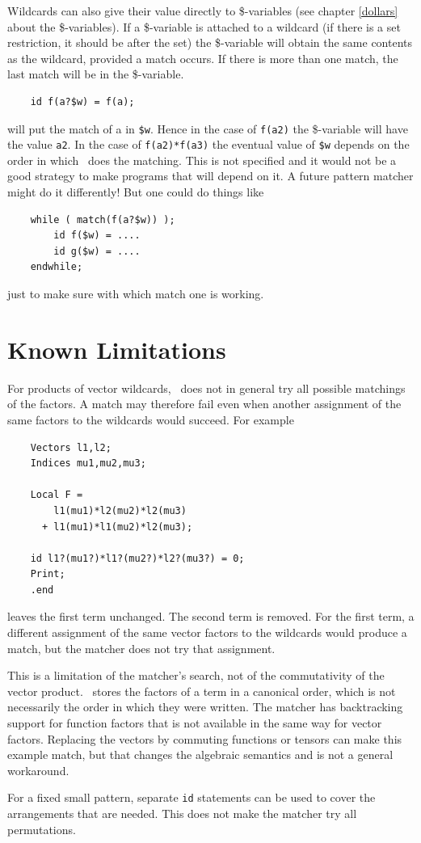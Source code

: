Wildcards can also give their value directly to
\$-variables (see chapter
\ref{dollars} about the \$-variables). If a \$-variable is attached to a
wildcard (if there is a set restriction, it should be after the set) the
\$-variable will obtain the same contents as the wildcard, provided a match
occurs. If there is more than one match, the last match will be in the
\$-variable.
\begin{verbatim}
    id f(a?$w) = f(a);
\end{verbatim}
will put the match of a in \verb:$w:. Hence in the case of \verb:f(a2): the 
\$-variable will have the value \verb:a2:. In the case of 
\verb:f(a2)*f(a3): the eventual value of \verb:$w: depends on the order in 
which \FORM\ does the matching. This is not specified and it would not be 
a good strategy to make programs that will depend on it. A future pattern 
matcher might do it differently! But one could do things like
\begin{verbatim}
    while ( match(f(a?$w)) );
        id f($w) = ....
        id g($w) = ....
    endwhile;
\end{verbatim}
just to make sure with which match one is working.

\section{Known Limitations}

For products of vector wildcards, \FORM\ does not in general try all
possible matchings of the factors.  A match may therefore fail even when
another assignment of the same factors to the wildcards would succeed.
For example
\begin{verbatim}
    Vectors l1,l2;
    Indices mu1,mu2,mu3;

    Local F =
        l1(mu1)*l2(mu2)*l2(mu3)
      + l1(mu1)*l1(mu2)*l2(mu3);

    id l1?(mu1?)*l1?(mu2?)*l2?(mu3?) = 0;
    Print;
    .end
\end{verbatim}
leaves the first term unchanged.  The second term is removed.  For the
first term, a different assignment of the same vector factors to the
wildcards would produce a match, but the matcher does not try that
assignment.

This is a limitation of the matcher's search, not of the commutativity
of the vector product.  \FORM\ stores the factors of a term in a
canonical order, which is not necessarily the order in which they were
written.  The matcher has backtracking support for function factors
that is not available in the same way for vector factors.  Replacing
the vectors by commuting functions or tensors can make this example
match, but that changes the algebraic semantics and is not a general
workaround.

For a fixed small pattern, separate \verb:id: statements can be used to
cover the arrangements that are needed.  This does not make the matcher
try all permutations.

